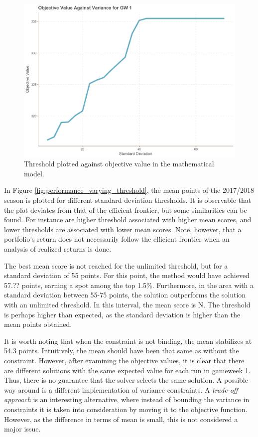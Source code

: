 \begin{figure}[H]
    \centering
    \includegraphics[scale=0.5]{fig/chapter_7/GW1_var.png}
    \caption{Threshold plotted against objective value in the mathematical model.}
\label{fig:threshold_GW1}    
\end{figure}%


In Figure \ref{fig:performance_varying_threshold}, the mean points of the 2017/2018 season is plotted for different standard deviation thresholds. It is observable that the plot deviates from that of the efficient frontier, but some similarities can be found. For instance are higher threshold associated with higher mean scores, and lower thresholds are associated with lower mean scores. Note, however, that a portfolio's return does not necessarily follow the efficient frontier when an analysis of realized returns is done.

\newpar

The best mean score is not reached for the unlimited threshold, but for a standard deviation of 55 points. For this point, the method would have achieved 57.?? points, earning a spot among the top 1.5\%. Furthermore, in the area with a standard deviation between 55-75 points, the solution outperforms the solution with an unlimited threshold. In this interval, the mean score is N. The threshold is perhaps higher than expected, as the standard deviation is higher than the mean points obtained.


\newpar

It is worth noting that when the constraint is not binding, the mean stabilizes at 54.3 points. Intuitively, the mean should have been that same as without the constraint. However, after examining the objective values, it is clear that there are different solutions with the same expected value for each run in gameweek 1. Thus, there is no guarantee that the solver selects the same solution. A possible way around is a different implementation of variance constraints. A \textit{trade-off approach} \citep{Speranza} is an interesting alternative, where instead of bounding the variance in constraints it is taken into consideration by moving it to the objective function. However, as the difference in terms of mean is small, this is not considered a major issue.

